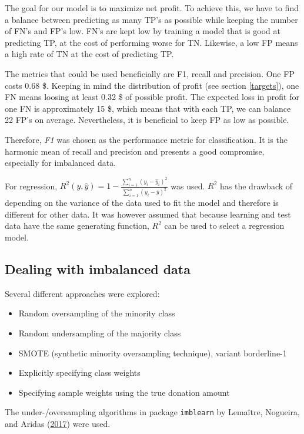 \documentclass[
  11pt,
  a4paper,
  DIV=12,captions=tableheading,oneside,titlepage=firstiscover,abstracton]{scrreprt}
\providecommand{\tightlist}{%
  \setlength{\itemsep}{0pt}\setlength{\parskip}{0pt}}
\providecommand{\tightlist}{%
  \setlength{\itemsep}{0pt}\setlength{\parskip}{0pt}}
\begin{document}
The goal for our model is to maximize net profit. To achieve this, we have to find a balance between predicting as many TP's as possible while keeping the number of FN's and FP's low. FN's are kept low by training a model that is good at predicting TP, at the cost of performing worse for TN. Likewise, a low FP means a high rate of TN at the cost of predicting TP.

The metrics that could be used beneficially are F1, recall and precision. One FP costs 0.68 \$. Keeping in mind the distribution of profit (see section \ref{targets}), one FN means loosing at least 0.32 \$ of possible profit. The expected loss in profit for one FN is approximately 15 \$, which means that with each TP, we can balance 22 FP's on average. Nevertheless, it is beneficial to keep FP as low as possible.

Therefore, \emph{F1} was chosen as the performance metric for classification. It is the harmonic mean of recall and precision and presents a good compromise, especially for imbalanced data.

For regression, \(R^2(y, \hat{y}) = 1- \frac{\sum_{i=1}^n(y_i-\hat{y}_i)^2}{\sum_{i=1}^n(y_i-\bar{y})^2}\) was used. \(R^2\) has the drawback of depending on the variance of the data used to fit the model and therefore is different for other data. It was however assumed that because learning and test data have the same generating function, \(R^2\) can be used to select a regression model.

\hypertarget{dealing-with-imbalanced-data}{%
\subsection{Dealing with imbalanced data}\label{dealing-with-imbalanced-data}}

Several different approaches were explored:

\begin{itemize}
\tightlist
\item
  Random oversampling of the minority class
\item
  Random undersampling of the majority class
\item
  SMOTE (synthetic minority oversampling technique), variant borderline-1
\item
  Explicitly specifying class weights
\item
  Specifying sample weights using the true donation amount
\end{itemize}

The under-/oversampling algorithms in package \texttt{imblearn} by Lemaître, Nogueira, and Aridas (\protect\hyperlink{ref-lemaitre2017imblearn}{2017}) were used.
\end{document}
